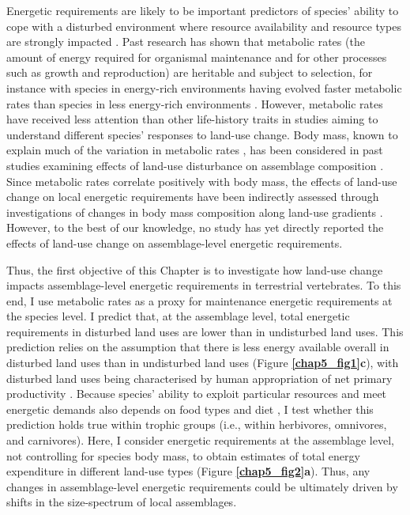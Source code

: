 Energetic requirements are likely to be important predictors of species’ ability to cope with a disturbed environment where resource availability and resource types are strongly impacted \citep{Auer2020}. Past research has shown that metabolic rates (the amount of energy required for organismal maintenance and for other processes such as growth and reproduction) are heritable and subject to selection, for instance with species in energy-rich environments having evolved faster metabolic rates than species in less energy-rich environments \citep{Mueller2001}. However, metabolic rates have received less attention than other life-history traits in studies aiming to understand different species’ responses to land-use change. Body mass, known to explain much of the variation in metabolic rates \citep{White2003, Hudson2013, Bushuev2018}, has been considered in past studies examining effects of land-use disturbance on assemblage composition \citep{Hevia2017}. Since metabolic rates correlate positively with body mass, the effects of land-use change on local energetic requirements have been indirectly assessed through investigations of changes in body mass composition along land-use gradients \citep{Newbold2020a, Tinoco2018}. However, to the best of our knowledge, no study has yet directly reported the effects of land-use change on assemblage-level energetic requirements. 

Thus, the first objective of this Chapter is to investigate how land-use change impacts assemblage-level energetic requirements in terrestrial vertebrates. To this end, I use metabolic rates as a proxy for maintenance energetic requirements at the species level. I predict that, at the assemblage level, total energetic requirements in disturbed land uses are lower than in undisturbed land uses. This prediction relies on the assumption that there is less energy available overall in disturbed land uses than in undisturbed land uses (Figure \textbf{\ref{chap5_fig1}c}), with disturbed land uses being characterised by human appropriation of net primary productivity \citep{Krausmann2013}. Because species’ ability to exploit particular resources and meet energetic demands also depends on food types and diet \citep{Mendoza2019, McNab1986}, I test whether this prediction holds true within trophic groups (i.e., within herbivores, omnivores, and carnivores). Here, I consider energetic requirements at the assemblage level, not controlling for species body mass, to obtain estimates of total energy expenditure in different land-use types (Figure \textbf{\ref{chap5_fig2}a}). Thus, any changes in assemblage-level energetic requirements could be ultimately driven by shifts in the size-spectrum of local assemblages. 

